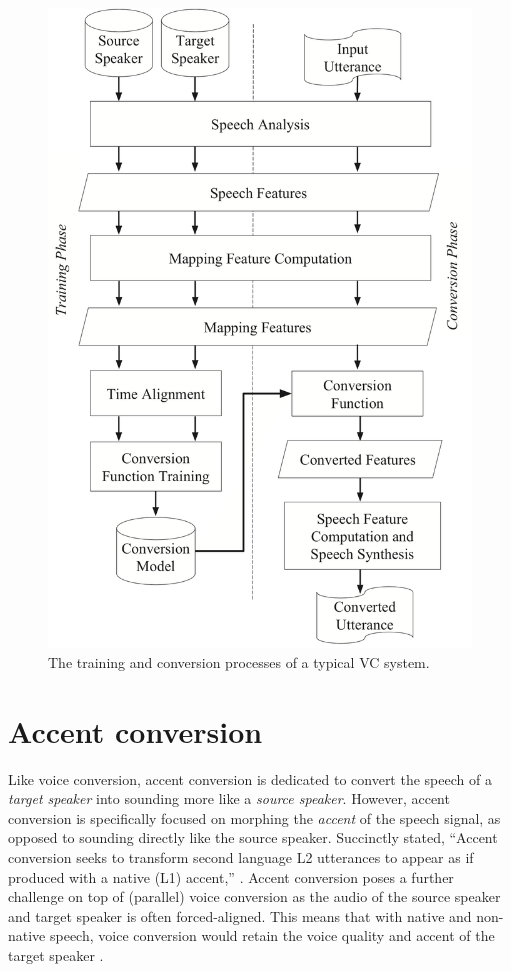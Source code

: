 \documentclass
[
    a4paper,
    twoside,
    12pt
]
{report}
\begin{document}
\begin{figure}[H]
\centering
\includegraphics[scale=0.25]{img/vc-flowchart.png}
\caption{The training and conversion processes of a typical VC system.}
\label{fig:vc-flowchart}
\end{figure}

\hypertarget{accent-conversion}{%
\section{Accent conversion}\label{accent-conversion}}

Like voice conversion, accent conversion is dedicated to convert the
speech of a \emph{target speaker} into sounding more like a \emph{source
speaker}. However, accent conversion is specifically focused on morphing
the \emph{accent} of the speech signal, as opposed to sounding directly
like the source speaker. Succinctly stated, ``Accent conversion seeks to
transform second language L2 utterances to appear as if produced with a
native (L1) accent,'' \parencite{aryal2014a}. Accent conversion poses a
further challenge on top of (parallel) voice conversion as the audio of
the source speaker and target speaker is often forced-aligned. This
means that with native and non-native speech, voice conversion would
retain the voice quality and accent of the target speaker
\parencite{aryal2014}.
\end{document}
